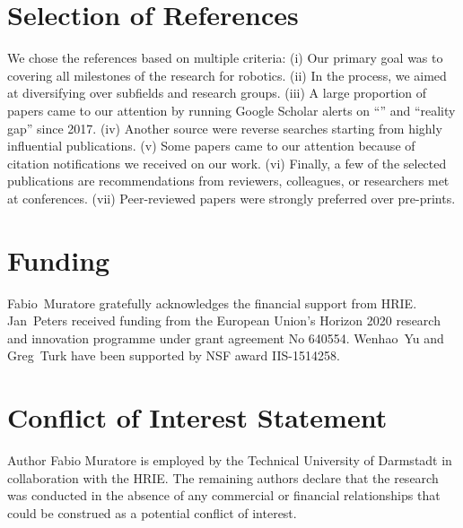 \documentclass[utf8]{frontiersSCNS} %
\begin{document}
\section*{Selection of References}
We chose the references based on multiple criteria:
(i) Our primary goal was to covering all milestones of the \simtoreal research for robotics.
(ii) In the process, we aimed at diversifying over subfields and research groups.
(iii) A large proportion of papers came to our attention by running Google Scholar alerts on \enquote{\simtoreal} and \enquote{reality gap} since 2017.
(iv) Another source were reverse searches starting from highly influential publications.
(v) Some papers came to our attention because of citation notifications we received on our work.
(vi) Finally, a few of the selected publications are recommendations from reviewers, colleagues, or researchers met at conferences. 
(vii) Peer-reviewed papers were strongly preferred over pre-prints.

\section*{Funding}
Fabio~Muratore gratefully acknowledges the financial support from \acl{HRIE}.
Jan~Peters received funding from the European Union’s Horizon 2020 research and innovation programme under grant agreement No 640554. Wenhao~Yu and Greg~Turk have been supported by NSF award IIS-1514258.

\section*{Conflict of Interest Statement}
Author Fabio Muratore is employed by the Technical University of Darmstadt in collaboration with the \acl{HRIE}. The remaining authors declare that the research was conducted in the absence of any commercial or financial relationships that could be construed as a potential conflict of interest.

% 
{}%
{}%

\end{document}

